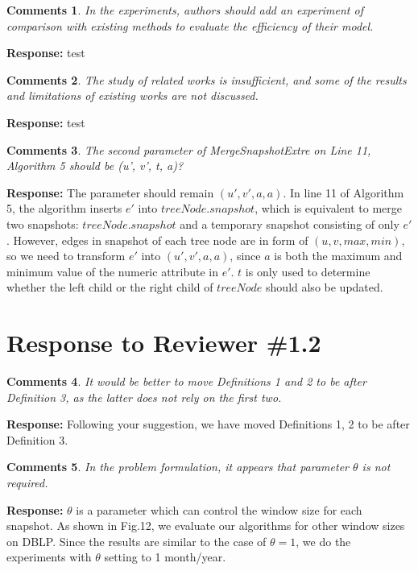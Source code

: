 \documentclass{article}
\newtheorem{Comments}{\textbf{Comments}}
\begin{document}
\begin{Comments}
In the experiments, authors should add an experiment of comparison with existing methods to evaluate the efficiency of their model.
\end{Comments}
\noindent \textbf{Response:} test

\begin{Comments}
The study of related works is insufficient, and some of the results and limitations of existing works are not discussed.
\end{Comments}
\noindent \textbf{Response:} test

\begin{Comments}
The second parameter of MergeSnapshotExtre on Line 11, Algorithm 5 should be (u’, v’, t, a)?
\end{Comments}
\noindent \textbf{Response:} The parameter should remain $ (u',v',a,a) $. In line 11 of Algorithm 5, the algorithm inserts $ e' $ into $ treeNode.snapshot $, which is equivalent to merge two snapshots: $ treeNode.snapshot $ and a temporary snapshot consisting of only $ e' $. However, edges in snapshot of each tree node are in form of $ (u,v,max,min) $, so we need to transform $ e' $ into $ (u',v',a,a) $, since $ a $ is both the maximum and minimum value of the numeric attribute in $ e' $. $ t $ is only used to determine whether the left child or the right child of $ treeNode $ should also be updated.



\section{Response to Reviewer \#1.2}
\setcounter{Comments}{0}
\begin{Comments}
It would be better to move Definitions 1 and 2 to be after Definition 3, as the latter does not rely on the first two.
\end{Comments}
\noindent \textbf{Response: } Following your suggestion, we have moved Definitions 1, 2 to be after Definition 3.


\begin{Comments}
In the problem formulation, it appears that parameter $\theta$ is not required.
\end{Comments}
\noindent \textbf{Response: } $\theta$ is a parameter which can control the window size for each snapshot. As shown in Fig.12, we evaluate our algorithms for other window sizes on DBLP. Since the results are similar to the case of $\theta=1$, we do the experiments with $\theta$ setting to 1 month/year.
\end{document}
